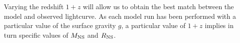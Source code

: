 \documentclass{aastex61}
\begin{document}
Varying the redshift $1+z$ will allow us to obtain the best match between the model and observed lightcurve.
As each model run has been performed with a particular value of the surface gravity $g$, a particular value of $1+z$ implies in turn specific values of $M_{\rm NS}$ and $R_{\rm NS}$. 

 
\end{document}
